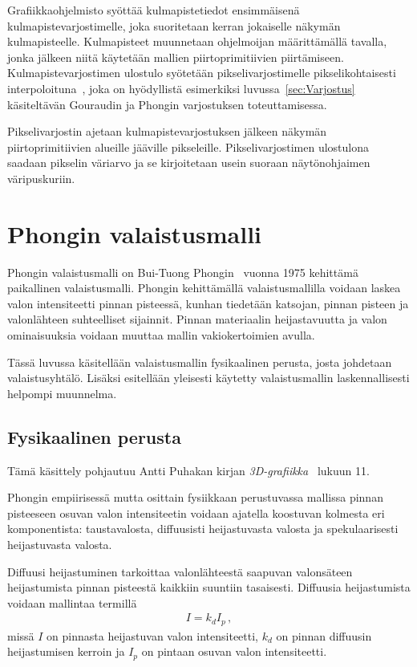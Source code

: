 \documentclass[finnish]{tktltiki2}
\theoremstyle{definition}
\theoremstyle{remark}
\begin{document}
Grafiikkaohjelmisto syöttää kulmapistetiedot ensimmäisenä kulmapistevarjostimelle, joka suoritetaan kerran jokaiselle näkymän kulmapisteelle. Kulmapisteet muunnetaan ohjelmoijan määrittämällä tavalla, jonka jälkeen niitä käytetään mallien piirtoprimitiivien piirtämiseen. Kulmapistevarjostimen ulostulo syötetään pikselivarjostimelle pikselikohtaisesti interpoloituna~\cite[s. 935-939]{Hughes}, joka on hyödyllistä esimerkiksi luvussa~\ref{sec:Varjostus} käsiteltävän Gouraudin ja Phongin varjostuksen toteuttamisessa.

Pikselivarjostin ajetaan kulmapistevarjostuksen jälkeen näkymän piirtoprimitiivien alueille jääville pikseleille. Pikselivarjostimen ulostulona saadaan pikselin väriarvo ja se kirjoitetaan usein suoraan näytönohjaimen väripuskuriin. 

\newpage
\section{Phongin valaistusmalli}
Phongin valaistusmalli on Bui-Tuong Phongin~\cite{Phong} vuonna 1975 kehittämä paikallinen valaistusmalli. Phongin kehittämällä valaistusmallilla voidaan laskea valon intensiteetti pinnan pisteessä, kunhan tiedetään katsojan, pinnan pisteen ja valonlähteen suhteelliset sijainnit. Pinnan materiaalin heijastavuutta ja valon ominaisuuksia voidaan muuttaa mallin vakiokertoimien avulla.

Tässä luvussa käsitellään valaistusmallin fysikaalinen perusta, josta johdetaan valaistusyhtälö. Lisäksi esitellään yleisesti käytetty valaistusmallin laskennallisesti helpompi muunnelma.

\subsection{Fysikaalinen perusta}
Tämä käsittely pohjautuu Antti Puhakan kirjan \textit{3D-grafiikka}~\cite{Puhakka} lukuun 11.

Phongin empiirisessä mutta osittain fysiikkaan perustuvassa mallissa pinnan pisteeseen osuvan valon intensiteetin voidaan ajatella koostuvan kolmesta eri komponentista: taustavalosta, diffuusisti heijastuvasta valosta ja spekulaarisesti heijastuvasta valosta.

Diffuusi heijastuminen tarkoittaa valonlähteestä saapuvan valonsäteen heijastumista pinnan pisteestä kaikkiin suuntiin tasaisesti. Diffuusia heijastumista voidaan mallintaa termillä
\begin{align*}
I = k_dI_p\,,
\end{align*}
missä $I$ on pinnasta heijastuvan valon intensiteetti, $k_d$ on pinnan diffuusin heijastumisen kerroin ja $I_p$ on pintaan osuvan valon intensiteetti.
\end{document}
